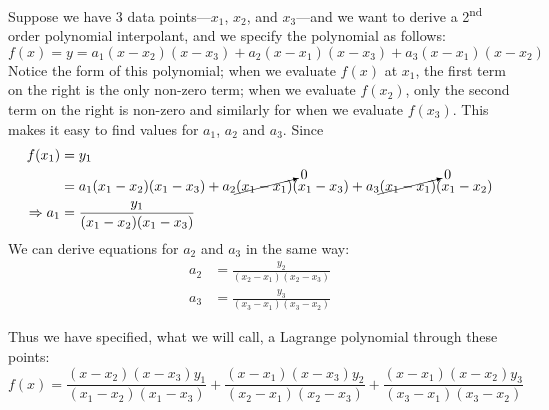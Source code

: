Suppose we have 3 data points---$x_1$, $x_2$, and $x_3$---and we want to derive a 2\textsuperscript{nd} order polynomial interpolant, and we specify the polynomial as follows:
\begin{equation*}
f(x) = y = a_1(x-x_2)(x-x_3) + a_2(x-x_1)(x-x_3) + a_3(x-x_1)(x-x_2)
\end{equation*}
Notice the form of this polynomial; when we evaluate $f(x)$ at $x_1$, the first term on the right is the only non-zero term; when we evaluate $f(x_2)$, only the second term on the right is non-zero and similarly for when we evaluate $f(x_3)$.  This makes it easy to find values for $a_1$, $a_2$ and $a_3$.  Since
\begin{align*}
f(x_1) &= y_1 \\
&=a_1(x_1 - x_2)(x_1 - x_3) + a_2 \cancelto{0}{(x_1 - x_1)}(x_1 - x_3) + a_3\cancelto{0}{(x_1 - x_1)}(x_1 - x_2) \\
\Rightarrow a_1 &= \frac{y_1}{(x_1 - x_2)(x_1 - x_3)} 
\end{align*}
We can derive equations for $a_2$ and $a_3$ in the same way:
\begin{align*}
a_2 & = \frac{y_2}{(x_2 - x_1)(x_2 - x_3)} \\
a_3 & = \frac{y_3}{(x_3 - x_1)(x_3 - x_2)}
\end{align*}

\noindent Thus we have specified, what we will call, a Lagrange polynomial through these points:
\begin{equation*}
f(x) = \frac{(x - x_2)(x - x_3)y_1}{(x_1 - x_2)(x_1 - x_3)} + \frac{(x - x_1)(x-x_3)y_2}{(x_2 - x_1)(x_2 - x_3)} + \frac{(x - x_1)(x-x_2)y_3}{(x_3-x_1)(x_3 - x_2)}
\end{equation*}
